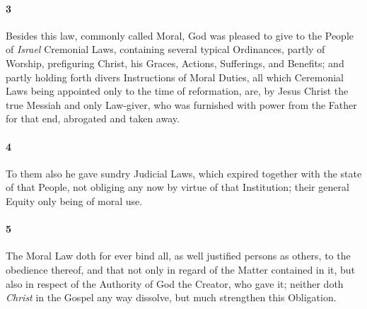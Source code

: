 \documentclass[
    paper=letterpaper,
    11pt,
    twoside,
    DIV=calc,
    openany
]{scrbook}
\begin{document}
\footnotebegin
{}
\footnoteend

\paragraph{3} %
Besides this law, commonly called Moral, God was pleased to give to the People of \textit{Israel} Cremonial Laws, containing several typical Ordinances, partly of Worship, \R{}prefiguring Christ, his Graces, Actions, Sufferings, and Benefits; and partly holding forth divers Instructions \R{}of Moral Duties, all which Ceremonial Laws being appointed only to the time of reformation, are, by Jesus Christ the true Messiah and only Law-giver, who was furnished with power from the Father for that end, \R{}abrogated and taken away.

\footnotebegin
{}
\footnoteend

\paragraph{4} %
To them also he gave sundry Judicial Laws, which expired together with the state of that People, not obliging any now by virtue of that Institution; their general \R{}Equity only being of moral use.

\footnotebegin
{}
\footnoteend

\paragraph{5} %
The Moral Law doth for ever bind all, \R{}as well justified persons as others, to the obedience thereof, and that not only in regard of the Matter contained in it, but also in respect of the \R{}Authority of God the Creator, who gave it; neither doth \textit{Christ} in the Gospel any way dissolve, \R{}but much strengthen this Obligation.

\footnotebegin
{}
\footnoteend
\end{document}
